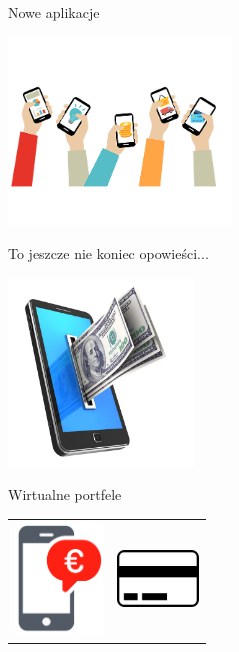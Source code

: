 \documentclass{beamer}
\begin{document}
\begin{frame}{Nowe aplikacje}
	\begin{center}
		\includegraphics[height=5cm]{phone2.png}
	\end{center}
\end{frame}

\begin{frame}{}
	\begin{center}
		\Huge{To jeszcze nie koniec opowieści...}
	\end{center}
\end{frame}

\begin{frame}{}
	\begin{center}
		\includegraphics[height=5cm]{wallet1.jpg}
	\end{center}
\end{frame}

\begin{frame}{Wirtualne portfele}
	\begin{center}
		\begin{tabular}{ c c }
  			\includegraphics[height=3cm]{wallet2.png} & \includegraphics[height=1.5cm]{prepaid1.png}
		\end{tabular}
	\end{center}
\end{frame}
\end{document}

